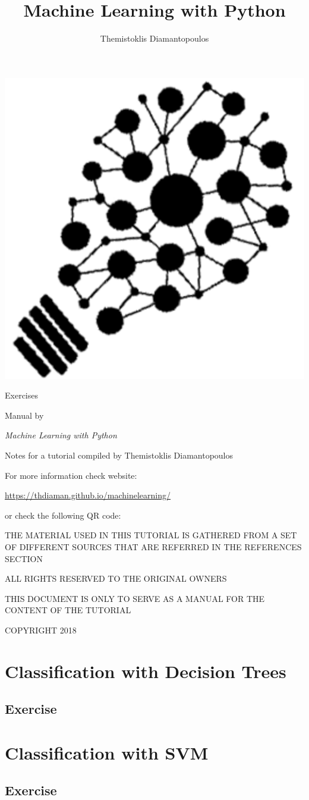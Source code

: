 \documentclass[10pt,twoside,a4paper,openany]{memoir}
\author{Themistoklis Diamantopoulos}
\title{Machine Learning with Python}
\date{}
\makeatletter
\def\maketitle{%
  \null
  \thispagestyle{empty}%
  \vfill

  \begin{center}
    \normalfont
    \centering

    \begin{minipage}{\linewidth}
    \centering
    \includegraphics[scale=0.3]{images/box-icon.png}
    \end{minipage}

    \vskip 1cm
    
    {\huge\@title\par}%
    \hrulefill\par
    \vskip 0.25cm
    {\LARGE Exercises}
    \vskip 0.75cm

    {\LARGE\raggedleft Manual by \@author\par}%
  \end{center}%
  \vfill
  \null
  \clearpage
  }
\makeatother
\begin{document}
\maketitle

\frontmatter

\null
\thispagestyle{empty}%
\vfill

\begin{flushleft}
\textit{Machine Learning with Python}

Notes for a tutorial compiled by Themistoklis Diamantopoulos

\vskip 0.2cm

For more information check website:

\url{https://thdiaman.github.io/machinelearning/}

or check the following QR code:

\vskip 0.2cm


\bigskip

THE MATERIAL USED IN THIS TUTORIAL IS GATHERED FROM A SET OF DIFFERENT SOURCES THAT ARE REFERRED IN THE REFERENCES SECTION

\vskip 0.2cm
ALL RIGHTS RESERVED TO THE ORIGINAL OWNERS

\vskip 0.2cm
THIS DOCUMENT IS ONLY TO SERVE AS A MANUAL FOR THE CONTENT OF THE TUTORIAL

\vskip 0.2cm
COPYRIGHT 2018

\end{flushleft}



\mainmatter

\chapter{Classification with Decision Trees}

\section{Exercise}



\chapter{Classification with SVM}

\section{Exercise}

\end{document}
